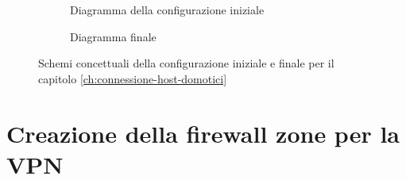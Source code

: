 \begin{figure}[H]
    \centering
    \begin{subfigure}{0.44\linewidth}
        \centering
        \usebox{\myimage}
        \caption{Diagramma della configurazione iniziale}
        \label{fig:diag2-host}
    \end{subfigure}
    \hfill
    \begin{subfigure}{0.53\linewidth}
        \centering
        \caption{Diagramma finale}
        \label{fig:diag2-host1}
    \end{subfigure}
    \caption{Schemi concettuali della configurazione iniziale e finale per il capitolo \ref{ch:connessione-host-domotici}}
\end{figure}

\section{Creazione della firewall zone per la VPN} 

